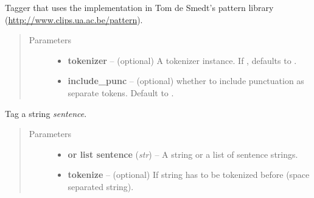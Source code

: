 \documentclass[letterpaper,10pt,english]{sphinxmanual}
\begin{document}
\begin{fulllineitems}
\label{api_reference:textblob_de.taggers.PatternTagger}
Tagger that uses the implementation in
Tom de Smedt's pattern library
(\href{http://www.clips.ua.ac.be/pattern}{http://www.clips.ua.ac.be/pattern}).
\begin{quote}\begin{description}
\item[{Parameters}] \leavevmode\begin{itemize}
\item {} 
\textbf{tokenizer} -- (optional) A tokenizer instance. If , defaults to
{\hyperref[api_reference:textblob_de.tokenizers.PatternTokenizer]{}}.

\item {} 
\textbf{include\_punc} -- (optional) whether to include punctuation as separate tokens.
Default to .

\end{itemize}

\end{description}\end{quote}

\begin{fulllineitems}
\label{api_reference:textblob_de.taggers.PatternTagger.tag}
Tag a string \emph{sentence}.
\begin{quote}\begin{description}
\item[{Parameters}] \leavevmode\begin{itemize}
\item {} 
\textbf{or list sentence} (\emph{str}) -- A string or a list of sentence strings.

\item {} 
\textbf{tokenize} -- (optional) If  string has to be tokenized before
(space separated string).

\end{itemize}

\end{description}\end{quote}

\end{fulllineitems}


\end{fulllineitems}
\end{document}
